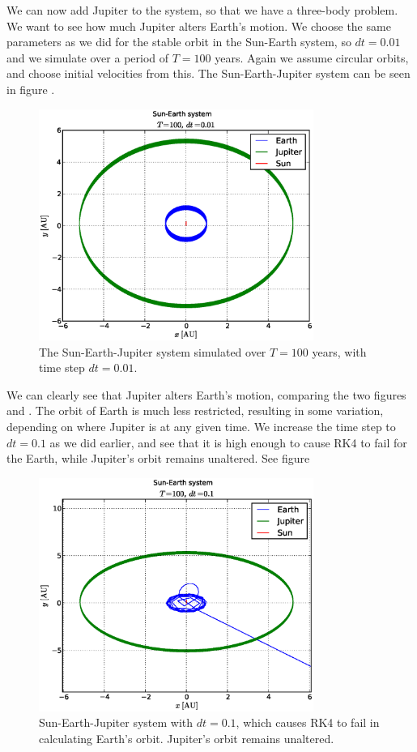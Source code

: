 
We can now add Jupiter to the system, so that we have a three-body problem. We
want to see how much Jupiter alters Earth's motion. We choose the same
parameters as we did for the stable orbit in the Sun-Earth system, so $dt =
0.01$ and we simulate over a period of $T = 100$ years. Again we assume circular
orbits, and choose initial velocities from this. The Sun-Earth-Jupiter
system can be seen in figure .
%
\begin{figure}[htpb]
	\centering
	\includegraphics[width=0.8\textwidth]{figures/sun_earth_jupiter_dt1e-2}
	\caption{The Sun-Earth-Jupiter system simulated over $T = 100$ years, with
	time step $dt = 0.01$.}
	\label{fig:sunEarthJupiter}
\end{figure}
%
We can clearly see that Jupiter alters Earth's motion, comparing the two
figures  and . The orbit of Earth
is much less restricted, resulting in some variation, depending on where Jupiter
is at any given time. We increase the time step to $dt = 0.1$ as
we did earlier, and see that it is high enough to cause RK4 to fail for the
Earth, while Jupiter's orbit remains unaltered. See figure
%
\begin{figure}[htpb]
	\centering
	\includegraphics[width=0.8\textwidth]{figures/sun_earth_jupiter_dt1e-1}
	\caption{Sun-Earth-Jupiter system with $dt = 0.1$, which causes RK4 to fail
	in calculating Earth's orbit. Jupiter's orbit remains unaltered.}
	\label{fig:sunEarthJupiter-dt1e-2}
\end{figure}
